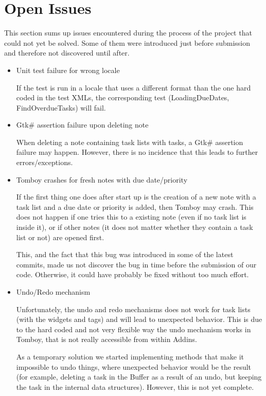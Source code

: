 \section{Open Issues}
\label{issues}

This section sums up issues encountered during the process of the project that could not yet be solved.
Some of them were introduced just before submission and therefore not discovered until after.

\begin{itemize}
\item Unit test failure for wrong locale

  If the test is run in a locale that uses a different format than the one hard coded in the test XMLs, the corresponding test (LoadingDueDates, FindOverdueTasks) will fail.

\item Gtk\# assertion failure upon deleting note

  When deleting a note containing task lists with tasks, a Gtk\# assertion failure may happen.
  However, there is no incidence that this leads to further errors/exceptions.

\item Tomboy crashes for fresh notes with due date/priority

  If the first thing one does after start up is the creation of a new note with a task list and a due date or priority is added, then Tomboy may crash. This does not happen if one tries this to a existing note (even if no task list is inside it), or if other notes (it does not matter whether they contain a task list or not) are opened first. 
  
This, and the fact that this bug was introduced in some of the latest commits, made us not discover the bug in time before the submission of our code. Otherwise, it could have probably be fixed without too much effort.

\item Undo/Redo mechanism

  Unfortunately, the undo and redo mechanisms does not work for task lists (with the widgets and tags) and will lead to unexpected behavior. This is due to the hard coded and not very flexible way the undo mechanism works in Tomboy, that is not really accessible from within Addins.
  
  As a temporary solution we started implementing methods that make it impossible to undo things, where unexpected behavior would be the result (for example, deleting a task in the Buffer as a result of an undo, but keeping the task in the internal data structures). However, this is not yet complete.


\end{itemize}

